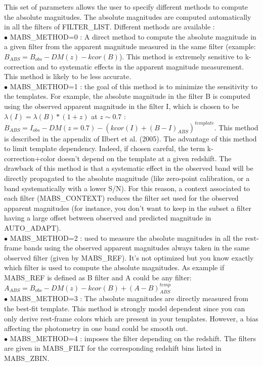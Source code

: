 \documentclass[12pt]{article}
\begin{document}
This  set of parameters allows the user to specify different methods to compute the absolute magnitudes. The absolute magnitudes are computed automatically in all the filters of FILTER\_LIST. Different methods are available : \\
%
$\bullet$ MABS\_METHOD=0 :  A direct method to compute the absolute magnitude in a 
given filter from the apparent magnitude measured in the same filter 
(example: $B_{ABS}=B_{obs}-DM(z)-kcor(B)$). 
This method is extremely sensitive to k-correction and to systematic effects in the apparent
 magnitude measurement.  This method is likely to be less accurate.\\
%
$\bullet$  MABS\_METHOD=1 : the goal of this method is to minimize the sensitivity to the templates.  
For example,  the absolute magnitude in the filter B is computed using the observed apparent magnitude in the filter I, which is chosen to be $\lambda(I)=\lambda(B)*(1+z)$ at $z\sim 0.7$ : 
$B_{ABS}= I_{obs} -DM(z=0.7) - (kcor(I) + (B-I)_{ABS})^{template}$.
 This method is described in the appendix of Ilbert et al. (2005). The advantage of this method to limit template  dependency. Indeed, if chosen careful, the term k-correction+color doesn't depend on the template at a given redshift. The drawback of this method is that a systematic effect in the observed band will be directly propagated to the absolute magnitude (like zero-point calibration, or a band systematically with a lower S/N). 
 For this reason, a context associated to each filter (MABS\_CONTEXT) reduces the filter set used for the observed apparent magnitudes (for instance, you don't want to keep in the subset a filter having a large offset between observed and predicted magnitude in AUTO\_ADAPT). \\
%
$\bullet$ MABS\_METHOD=2 : used to measure the absolute magnitudes in all the
 rest-frame bands using the observed apparent magnitudes always taken in the same
 observed filter (given by MABS\_REF). 
 It's not optimized but you know exactly which filter is used to compute the absolute magnitudes. 
  As example if MABS\_REF is defined as B  filter and A could be any filter:
   $A_{ABS}=B_{obs}-DM(z)- kcor(B) + (A-B)_{ABS}^{temp} $ \\ 
%
 $\bullet$  MABS\_METHOD=3 :  The absolute magnitudes are directly measured from the best-fit template. This method is strongly model dependent since you can only derive rest-frame colors which are present in your templates. However, a bias affecting the photometry in one band could be smooth out. \\  
%
$\bullet$ MABS\_METHOD=4 : imposes the filter depending on the redshift. 
The filters are given in MABS\_FILT for the  corresponding redshift bins listed in MABS\_ZBIN. \\
%
\end{document}
